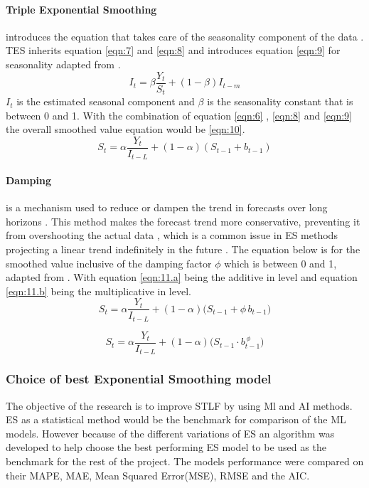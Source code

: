  \paragraph{Triple Exponential Smoothing } introduces the equation that takes care of the seasonality component of the data \cite{nist_double_exp_smoothing}. TES inherits equation \ref{eqn:7} and \ref{eqn:8} and introduces equation \ref{eqn:9} for seasonality adapted from \cite{nist_double_exp_smoothing}.
 \[
 I_t = \beta \frac{Y_t}{S_t} + (1-\beta) I_{t-m}  
 \tag{9}
 \label{eqn:9}
 \]
 $I_t$ is the estimated seasonal component and $\beta$ is the seasonality constant that is between 0 and 1. With the combination of equation \ref{eqn:6} , \ref{eqn:8}  and \ref{eqn:9} the overall smoothed value equation would be \ref{eqn:10}. 
 \[
 S_t = \alpha \frac{Y_t}{I_{t-L}} + (1-\alpha)(S_{t-1}+b_{t-1})
 \tag{10}
 \label{eqn:10}
 \]
 
 \paragraph{Damping} is a mechanism used to reduce or dampen the trend in forecasts over long horizons \cite{taylor2003exponential}. This method makes the forecast trend more conservative, preventing it from overshooting the actual data , which is a common issue in ES methods projecting a linear trend indefinitely in the future \cite{taylor2003exponential}. The equation below is for the smoothed value inclusive of the damping factor $\phi$ which is between 0 and 1, adapted from \cite{taylor2003exponential}. With equation \ref{eqn:11.a} being the additive in level and equation \ref{eqn:11.b} being the multiplicative in level.
 \[
 	S_t = \alpha \frac{Y_t}{I_{t-L}} + (1-\alpha)\bigl(S_{t-1} + \phi\, b_{t-1}) 
 \tag{11.a}
 \label{eqn:11.a}
 \]
 
 
 \[
 S_t = \alpha \frac{Y_t}{I_{t-L}} + (1-\alpha)\bigl(S_{t-1} \cdot b_{t-1}^{\,\phi}\bigr)
 \tag{11.b}
 \label{eqn:11.b}
 \]
 

 \subsubsection{Choice of best Exponential Smoothing model}
 The objective of the research is to improve STLF by using Ml and AI methods. ES as a statistical method would  be the benchmark for comparison of the ML models. However because of the different variations of ES an algorithm was  developed to help choose the best performing ES model to be used as the benchmark for the rest of the project. The models performance were compared on their MAPE, MAE, Mean Squared Error(MSE), RMSE and the AIC.
 
